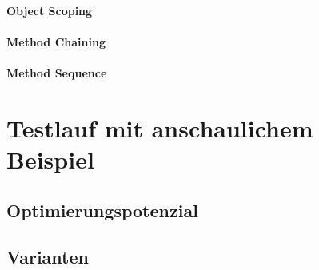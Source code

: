 \documentclass[../InterneDSLs.tex]{subfiles}
\begin{document}
\subsubsection{Object Scoping}
\subsubsection{Method Chaining}
\subsubsection{Method Sequence}


\chapter{Testlauf mit anschaulichem Beispiel}
\section{Optimierungspotenzial}
\section{Varianten}
\end{document}

